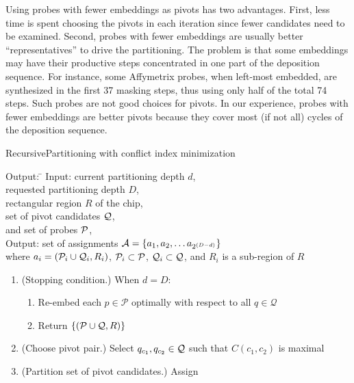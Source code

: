 Using probes with fewer embeddings as pivots has two advantages. First, less
time is spent choosing the pivots in each iteration since fewer candidates need
to be examined. Second, probes with fewer embeddings are usually better
``representatives'' to drive the partitioning. The problem is that some
embeddings may have their productive steps concentrated in one part of the
deposition sequence. For instance, some Affymetrix probes, when left-most
embedded, are synthesized in the first 37 masking steps, thus using only half of
the total 74 steps. Such probes are not good choices for pivots. In our
experience, probes with fewer embeddings are better pivots because they cover
most (if not all) cycles of the deposition sequence.

\begin{algorithm}[t!]
\caption{RecursivePartitioning with conflict index minimization}
\label{alg:pp_recurse}
\begin{minipage}{\textwidth}\footnotesize{
\begin{tabbing}
Output: \= \kill
Input:  \> current partitioning depth $d$, \\
        \> requested partitioning depth $D$, \\
        \> rectangular region $R$ of the chip, \\
        \> set of pivot candidates ${\mathcal{Q}}$, \\
        \> and set of probes ${\mathcal{P}}$, \\
Output: \> set of assignments ${\mathcal{A}} = \{a_1, a_2, \dots a_{2^{(D-d)}}\}$ \\
        \> where $a_i = ({\mathcal{P}}_i \cup {\mathcal{Q}}_i, R_i)$, ${\mathcal{P}}_i \subset {\mathcal{P}}$,
           ${\mathcal{Q}}_i \subset {\mathcal{Q}}$, and $R_i$ is a sub-region of $R$
\end{tabbing}
\begin{enumerate}
\item \label{step:pp_stop} (Stopping condition.) When $d = D$:
  \begin{enumerate}
    \item Re-embed each $p \in \mathcal{P}$ optimally with respect to all
          $q \in \mathcal{Q}$
    \item Return $\{({\mathcal{P}} \cup {\mathcal{Q}}, R)\}$
  \end{enumerate}
\item (Choose pivot pair.) \label{step:pp_pivots} Select
      $q_{c_1}, q_{c_2} \in {\mathcal{Q}}$ such that $C(c_1,c_2)$ is maximal
\item \label{step:pp_part_pivots} (Partition set of pivot candidates.) Assign

\end{enumerate}}
\end{minipage}
\end{algorithm}

